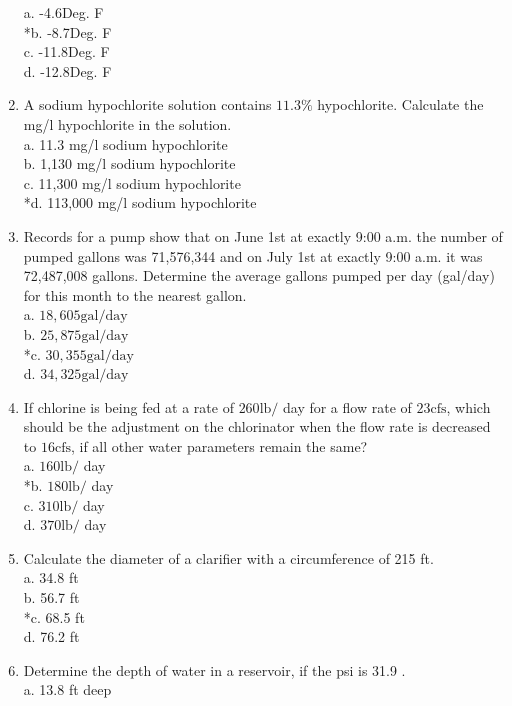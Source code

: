 \begin{enumerate}
a. -4.6Deg. F\\
*b. -8.7Deg. F\\
c. -11.8Deg. F\\
d. -12.8Deg. F\\
\item A sodium hypochlorite solution contains $11.3 \%$ hypochlorite. Calculate the mg/l hypochlorite in the solution.\\
a. 11.3 mg/l sodium hypochlorite\\
b. 1,130 mg/l sodium hypochlorite\\
c. 11,300 mg/l sodium hypochlorite\\
*d. 113,000 mg/l sodium hypochlorite\\
\item Records for a pump show that on June 1st at exactly 9:00 a.m. the number of pumped gallons was 71,576,344 and on July 1st at exactly 9:00 a.m. it was 72,487,008 gallons. Determine the average gallons pumped per day (gal/day) for this month to the nearest gallon.\\
a. $18,605 \mathrm{gal} / \mathrm{day}$\\
b. $25,875 \mathrm{gal} / \mathrm{day}$\\
*c. $30,355 \mathrm{gal} / \mathrm{day}$\\
d. $34,325 \mathrm{gal} / \mathrm{day}$ \\
\item If chlorine is being fed at a rate of $260 \mathrm{lb} /$ day for a flow rate of $23 \mathrm{cfs}$, which should be the adjustment on the chlorinator when the flow rate is decreased to $16 \mathrm{cfs}$, if all other water parameters remain the same?\\
a. $160 \mathrm{lb} /$ day\\
*b. $180 \mathrm{lb} /$ day\\
c. $310 \mathrm{lb} /$ day\\
d. $370 \mathrm{lb} /$ day\\
\item Calculate the diameter of a clarifier with a circumference of 215 ft.\\
a. 34.8 ft\\
b. 56.7 ft\\
*c. 68.5 ft\\
d. 76.2 ft\\
\item Determine the depth of water in a reservoir, if the psi is 31.9 .\\
a. 13.8 ft deep\\

\end{enumerate}
